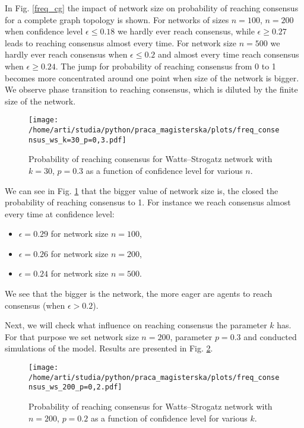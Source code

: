 \documentclass[a4paper, 12pt]{article}
\begin{document}
In Fig. \ref{freq_cg} the impact of network size on probability of reaching consensus for a complete graph topology is shown. For networks of sizes $n=100$, $n=200$ when confidence level $\epsilon\leq0.18$ we hardly ever reach consensus, while $\epsilon\geq0.27$ leads to reaching consensus almost every time.
For network size $n=500$ we hardly ever reach consensus when $\epsilon\leq0.2$ and almost every time reach consensus when $\epsilon\geq0.24$. The jump for probability of reaching consensus from 0 to 1 becomes more concentrated around one point when size of the network is bigger.  
We observe phase transition to reaching consensus, which is diluted by the finite size of the network.

\begin{figure}[H]
		\centering
		\texttt{[image: /home/arti/studia/python/praca\_magisterska/plots/freq\_consensus\_ws\_k=30\_p=0,3.pdf]}
		\caption{Probability of reaching consensus for Watts--Strogatz network with $k=30$, $p=0.3$ as a function of confidence level for various $n$.}
		\label{f9}
\end{figure}

We can see in Fig. \ref{f9} that the bigger value of network size is, the closed the probability of reaching consensus to 1. For instance we reach consensus almost every time at confidence level:
\begin{itemize}
\item  $\epsilon=0.29$ for network size $n=100$,
\item  $\epsilon=0.26$ for network size $n=200$,
\item  $\epsilon=0.24$ for network size $n=500$.
\end{itemize}
\indent

We see that the bigger is the network, the more eager are agents to reach consensus (when $\epsilon>0.2$).

\indent

Next, we will check what influence on reaching consensus the parameter $k$ has. For that purpose we set network size $n=200$, parameter $p=0.3$ and conducted simulations of the model. Results are presented in Fig. \ref{freq_ws}.

\begin{figure}[H]
		\centering
		\texttt{[image: /home/arti/studia/python/praca\_magisterska/plots/freq\_consensus\_ws\_200\_p=0,2.pdf]}
		\caption{Probability of reaching consensus for Watts--Strogatz network with $n=200$, $p=0.2$ as a function of confidence level for various $k$.}
		\label{freq_ws}
\end{figure}
\end{document}
